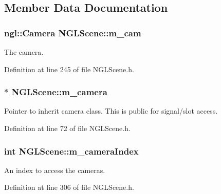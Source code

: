 \subsection{Member Data Documentation}
\subsubsection[{m\-\_\-cam}]{\setlength{\rightskip}{0pt plus 5cm}ngl\-::\-Camera N\-G\-L\-Scene\-::m\-\_\-cam\hspace{0.3cm}{\ttfamily [private]}}\label{class_n_g_l_scene_a4faea2adadeaad479ff774e8345815e6}


The camera. 



Definition at line 245 of file N\-G\-L\-Scene.\-h.

\subsubsection[{m\-\_\-camera}]{$\ast$ N\-G\-L\-Scene\-::m\-\_\-camera}\label{class_n_g_l_scene_a427beb908d9628726e8e29316e055fb0}


Pointer to inherit camera class. This is public for signal/slot access. 



Definition at line 72 of file N\-G\-L\-Scene.\-h.

\subsubsection[{m\-\_\-camera\-Index}]{\setlength{\rightskip}{0pt plus 5cm}int N\-G\-L\-Scene\-::m\-\_\-camera\-Index\hspace{0.3cm}{\ttfamily [private]}}\label{class_n_g_l_scene_ab303cb530fdbb47beab36770b695b834}


An index to access the cameras. 



Definition at line 306 of file N\-G\-L\-Scene.\-h.

